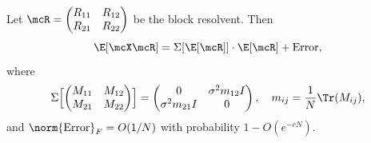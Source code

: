 \begin{proposition}\label{prop:self-energy}
Let $\mcR = \begin{pmatrix} R_{11} & R_{12} \\ R_{21} & R_{22} \end{pmatrix}$ be the block resolvent. Then
\begin{equation}\label{eq:self-energy-formula}
\E[\mcX \mcR] = \Sigma[\E[\mcR]] \cdot \E[\mcR] + \text{Error},
\end{equation}
where
\begin{equation}
\Sigma\Bigl[\begin{pmatrix} M_{11} & M_{12} \\ M_{21} & M_{22} \end{pmatrix}\Bigr]
= \begin{pmatrix} 0 & \sigma^2 m_{12} I \\ \sigma^2 m_{21} I & 0 \end{pmatrix},
\quad
m_{ij} = \frac{1}{N}\Tr(M_{ij}),
\end{equation}
and $\norm{\text{Error}}_F = O(1/N)$ with probability $1 - O(e^{-cN})$.
\end{proposition}
